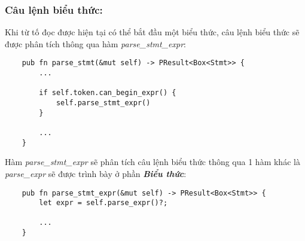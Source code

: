 \subsubsection{Câu lệnh biểu thức:} 
Khi từ tố đọc được hiện tại có thể bắt đầu một biểu thức, câu lệnh biểu thức sẽ được phân tích thông qua hàm \textit{parse\_stmt\_expr}:
\begin{lstlisting}
    pub fn parse_stmt(&mut self) -> PResult<Box<Stmt>> {
        ...
    
        if self.token.can_begin_expr() {
            self.parse_stmt_expr()
        }
        
        ...
    }
\end{lstlisting}
Hàm \textit{parse\_stmt\_expr} sẽ phân tích câu lệnh biểu thức thông qua 1 hàm khác là \textit{parse\_expr} sẽ được trình bày ở phần \textbf{\textit{Biểu thức}}:
\begin{lstlisting}
    pub fn parse_stmt_expr(&mut self) -> PResult<Box<Stmt>> {
        let expr = self.parse_expr()?;
        
        ...
    }
\end{lstlisting}

